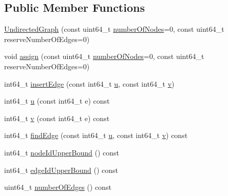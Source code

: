 \subsection*{Public Member Functions}
\begin{DoxyCompactItemize}
\item 
\hyperlink{classnifty_1_1graph_1_1UndirectedGraph_a3c2087810feadcef80e0a1a1ca288b43}{Undirected\+Graph} (const uint64\+\_\+t \hyperlink{classnifty_1_1graph_1_1UndirectedGraph_a6c6acc627c6a90269c06fb34a8c1973d}{number\+Of\+Nodes}=0, const uint64\+\_\+t reserve\+Number\+Of\+Edges=0)
\item 
void \hyperlink{classnifty_1_1graph_1_1UndirectedGraph_a0c4b2840735519b961431c64400c2dc2}{assign} (const uint64\+\_\+t \hyperlink{classnifty_1_1graph_1_1UndirectedGraph_a6c6acc627c6a90269c06fb34a8c1973d}{number\+Of\+Nodes}=0, const uint64\+\_\+t reserve\+Number\+Of\+Edges=0)
\item 
int64\+\_\+t \hyperlink{classnifty_1_1graph_1_1UndirectedGraph_a72feacfbdf4fcf8025182cadd1ac62ea}{insert\+Edge} (const int64\+\_\+t \hyperlink{classnifty_1_1graph_1_1UndirectedGraph_a65e4fc15d99d3198592231092dbd5cd3}{u}, const int64\+\_\+t \hyperlink{classnifty_1_1graph_1_1UndirectedGraph_a5d27d9bbc47026eda2223f53e41b1d22}{v})
\item 
int64\+\_\+t \hyperlink{classnifty_1_1graph_1_1UndirectedGraph_a65e4fc15d99d3198592231092dbd5cd3}{u} (const int64\+\_\+t e) const 
\item 
int64\+\_\+t \hyperlink{classnifty_1_1graph_1_1UndirectedGraph_a5d27d9bbc47026eda2223f53e41b1d22}{v} (const int64\+\_\+t e) const 
\item 
int64\+\_\+t \hyperlink{classnifty_1_1graph_1_1UndirectedGraph_a6988247544e191fb6acceb58b826c736}{find\+Edge} (const int64\+\_\+t \hyperlink{classnifty_1_1graph_1_1UndirectedGraph_a65e4fc15d99d3198592231092dbd5cd3}{u}, const int64\+\_\+t \hyperlink{classnifty_1_1graph_1_1UndirectedGraph_a5d27d9bbc47026eda2223f53e41b1d22}{v}) const 
\item 
int64\+\_\+t \hyperlink{classnifty_1_1graph_1_1UndirectedGraph_a0e62fb3ccc0d599b1d5857bf1f39973b}{node\+Id\+Upper\+Bound} () const 
\item 
int64\+\_\+t \hyperlink{classnifty_1_1graph_1_1UndirectedGraph_ac20fc58728aa6d70c5cfca9f4c7d7b9c}{edge\+Id\+Upper\+Bound} () const 
\item 
uint64\+\_\+t \hyperlink{classnifty_1_1graph_1_1UndirectedGraph_a7c5d24028937e4119315bde14a4ccc7d}{number\+Of\+Edges} () const 
\item 

\end{DoxyCompactItemize}
